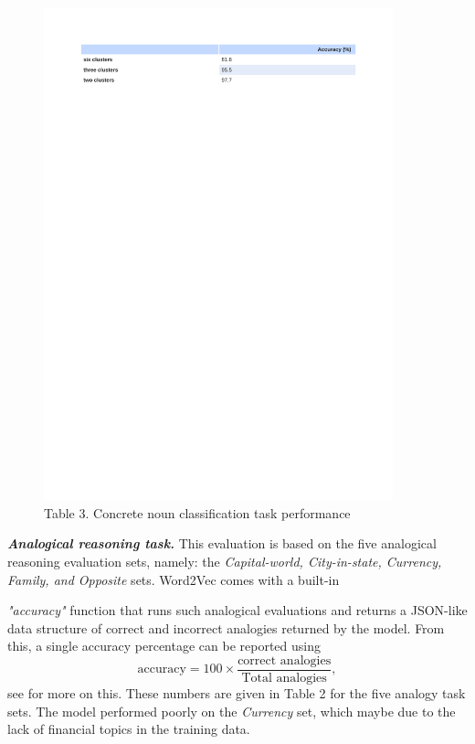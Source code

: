 \documentclass[12pt]{report}
\begin{document}
	\begin{figure}
		\centering
		\includegraphics[trim=2.0cm 25cm 2cm 2cm, clip=true,width=0.9\textwidth]{./Figures/google-cluster.pdf}
		\caption*{Table 3. Concrete noun classification task performance}
		\label{fig:class}
	\end{figure}

\noindent\textbf{\emph{Analogical reasoning task.}} This evaluation is based on the five analogical reasoning evaluation sets, namely: the \emph{Capital-world, City-in-state, Currency, Family, and Opposite} sets. Word2Vec comes with a built-in 

\noindent\emph{"accuracy"} function that runs such analogical evaluations and returns a JSON-like data structure of correct and incorrect analogies returned by the model.
From this, a single accuracy percentage can be reported using 
\[
\text{accuracy} = 100 \times \frac{\text{correct analogies}}{\text{Total analogies}},
\]
\noindent see \cite{accuracy} for more on this. These numbers are given in Table 2 for the five analogy task sets. The model performed poorly on the \emph{Currency} set, which maybe due to
the lack of financial topics in the training data.
\end{document}
